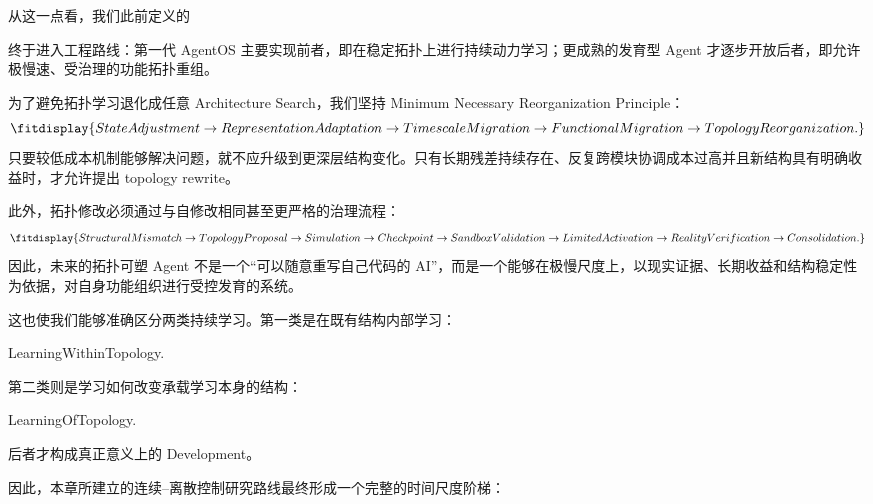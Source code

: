 从这一点看，我们此前定义的
\begin{statementbox}
\centering
{}
\end{statementbox}
终于进入工程路线：第一代 AgentOS 主要实现前者，即在稳定拓扑上进行持续动力学习；更成熟的发育型 Agent 才逐步开放后者，即允许极慢速、受治理的功能拓扑重组。

为了避免拓扑学习退化成任意 Architecture Search，我们坚持 Minimum Necessary Reorganization Principle：
\[
\fitdisplay{
StateAdjustment
\rightarrow
RepresentationAdaptation
\rightarrow
TimescaleMigration
\rightarrow
FunctionalMigration
\rightarrow
TopologyReorganization.
}
\]
只要较低成本机制能够解决问题，就不应升级到更深层结构变化。只有长期残差持续存在、反复跨模块协调成本过高并且新结构具有明确收益时，才允许提出 topology rewrite。

此外，拓扑修改必须通过与自修改相同甚至更严格的治理流程：
\[
\fitdisplay{
StructuralMismatch
\rightarrow
TopologyProposal
\rightarrow
Simulation
\rightarrow
Checkpoint
\rightarrow
SandboxValidation
\rightarrow
LimitedActivation
\rightarrow
RealityVerification
\rightarrow
Consolidation.
}
\]
因此，未来的拓扑可塑 Agent 不是一个``可以随意重写自己代码的 AI''，而是一个能够在极慢尺度上，以现实证据、长期收益和结构稳定性为依据，对自身功能组织进行受控发育的系统。

这也使我们能够准确区分两类持续学习。第一类是在既有结构内部学习：
\begin{statementbox}
LearningWithinTopology.
\end{statementbox}
第二类则是学习如何改变承载学习本身的结构：
\begin{statementbox}
LearningOfTopology.
\end{statementbox}
后者才构成真正意义上的 Development。

因此，本章所建立的连续--离散控制研究路线最终形成一个完整的时间尺度阶梯：
\begin{statementbox}
\centering
{}
\end{statementbox}

